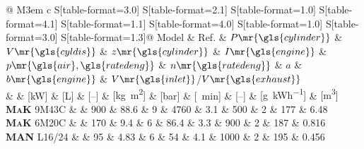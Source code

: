 \begin{appendices}
\begin{landscape}
\begin{table}%
\small
\ttabbox%
{%
	\caption[Engines used in simulation]{Parameters of engines as illustrated in \cref{ch:engine_parameters}. Two-stroke working cycles equal \(a=1\), accordingly \(a=2\) for four-stroke. Intake and exhaust manifold sizes are assumed equal}%
	\label{tab:engine_parameters}%
}%
{%
\begin{tabular}{@{}
	M{3em}
	c
	S[table-format=3.0]
	S[table-format=2.1]
	S[table-format=1.0]
	S[table-format=4.1]
	S[table-format=1.1]
	S[table-format=4.0]
	S[table-format=1.0]
	S[table-format=3.0]
	S[table-format=1.3]@{}}
\toprule
	Model & Ref. & {\(P\mr{\gls{cylinder}}\)} & {\(V\mr{\gls{cyldis}}\)} & {\(z\mr{\gls{cylinder}}\)} & {\(I\mr{\gls{engine}}\)} & {\(p\mr{\gls{air},\gls{ratedeng}}\)} & {\(n\mr{\gls{ratedeng}}\)} & {\(a\)} & {\(b\mr{\gls{engine}}\)\mpfootnotemark[1]} & {\(V\mr{\gls{inlet}}\)/\(V\mr{\gls{exhaust}}\)\mpfootnotemark[2]}\\
	& & {[\si{\kilo\watt}]} & {[\si{\liter}]} & {[--]} & {[\si{\kilogram\meter\squared}]} & {[\si{\bar}]} & {[\si{\per\minute}]} & {[--]} & {[\si{\gram\per\kWh}]} & {[\si{\meter\cubed}]}\\
\midrule
	\textsc{\textbf{MaK} 9M43C} & \autocite{caterpillar_motoren_gmbh_m_2008} & 900 & 88.6 & 9 & 4760 & 3.1 & 500 & 2 & 177 & 6.48\\
	\textsc{\textbf{MaK} 6M20C} & \autocite{caterpillar_motoren_gmbh_m_2012} & 170 & 9.4 & 6 & 86.4 & 3.3 & 900 & 2 & 187 & 0.816\\
	\textsc{\textbf{MAN} L16/24} & \autocite{man_diesel_and_turbo_l16/24_2018} & 95 & 4.83 & 6 & 54 & 4.1 & 1000 & 2 & 195 & 0.456\\
\bottomrule
\end{tabular}
%
%
}%
\end{table}


\end{landscape}
\end{appendices}
